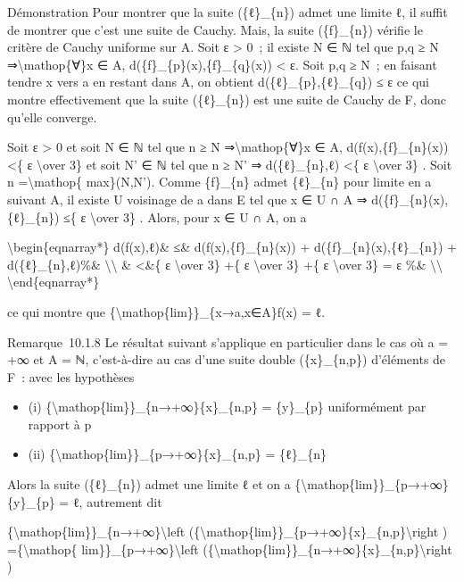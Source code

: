 \documentclass[]{article}
\begin{document}
Démonstration Pour montrer que la suite (\{ℓ\}\_\{n\}) admet une limite
ℓ, il suffit de montrer que c'est une suite de Cauchy. Mais, la suite
(\{f\}\_\{n\}) vérifie le critère de Cauchy uniforme sur A. Soit ε
\textgreater{} 0~; il existe N ∈ ℕ tel que p,q ≥ N
⇒\textbackslash{}mathop\{∀\}x ∈ A, d(\{f\}\_\{p\}(x),\{f\}\_\{q\}(x))
\textless{} ε. Soit p,q ≥ N~; en faisant tendre x vers a en restant dans
A, on obtient d(\{ℓ\}\_\{p\},\{ℓ\}\_\{q\}) ≤ ε ce qui montre
effectivement que la suite (\{ℓ\}\_\{n\}) est une suite de Cauchy de F,
donc qu'elle converge.

Soit ε \textgreater{} 0 et soit N ∈ ℕ tel que n ≥ N
⇒\textbackslash{}mathop\{∀\}x ∈ A, d(f(x),\{f\}\_\{n\}(x)) \textless{}\{
ε \textbackslash{}over 3\} et soit N' ∈ ℕ tel que n ≥ N' ⇒
d(\{ℓ\}\_\{n\},ℓ) \textless{}\{ ε \textbackslash{}over 3\} . Soit n
=\textbackslash{}mathop\{ max\}(N,N'). Comme \{f\}\_\{n\} admet
\{ℓ\}\_\{n\} pour limite en a suivant A, il existe U voisinage de a dans
E tel que x ∈ U ∩ A ⇒ d(\{f\}\_\{n\}(x),\{ℓ\}\_\{n\}) ≤\{ ε
\textbackslash{}over 3\} . Alors, pour x ∈ U ∩ A, on a

\textbackslash{}begin\{eqnarray*\} d(f(x),ℓ)\& ≤\&
d(f(x),\{f\}\_\{n\}(x)) + d(\{f\}\_\{n\}(x),\{ℓ\}\_\{n\}) +
d(\{ℓ\}\_\{n\},ℓ)\%\& \textbackslash{}\textbackslash{} \&
\textless{}\&\{ ε \textbackslash{}over 3\} +\{ ε \textbackslash{}over
3\} +\{ ε \textbackslash{}over 3\} = ε \%\&
\textbackslash{}\textbackslash{} \textbackslash{}end\{eqnarray*\}

ce qui montre que \{\textbackslash{}mathop\{lim\}\}\_\{x→a,x∈A\}f(x) =
ℓ.

Remarque~10.1.8 Le résultat suivant s'applique en particulier dans le
cas où a = +∞ et A = ℕ, c'est-à-dire au cas d'une suite double
(\{x\}\_\{n,p\}) d'éléments de F~: avec les hypothèses

\begin{itemize}
\itemsep1pt\parskip0pt
\item
  (i) \{\textbackslash{}mathop\{lim\}\}\_\{n→+∞\}\{x\}\_\{n,p\} =
  \{y\}\_\{p\} uniformément par rapport à p
\item
  (ii) \{\textbackslash{}mathop\{lim\}\}\_\{p→+∞\}\{x\}\_\{n,p\} =
  \{ℓ\}\_\{n\}
\end{itemize}

Alors la suite (\{ℓ\}\_\{n\}) admet une limite ℓ et on a
\{\textbackslash{}mathop\{lim\}\}\_\{p→+∞\}\{y\}\_\{p\} = ℓ, autrement
dit

\{\textbackslash{}mathop\{lim\}\}\_\{n→+∞\}\textbackslash{}left
(\{\textbackslash{}mathop\{lim\}\}\_\{p→+∞\}\{x\}\_\{n,p\}\textbackslash{}right
) =\{\textbackslash{}mathop\{ lim\}\}\_\{p→+∞\}\textbackslash{}left
(\{\textbackslash{}mathop\{lim\}\}\_\{n→+∞\}\{x\}\_\{n,p\}\textbackslash{}right
)
\end{document}
